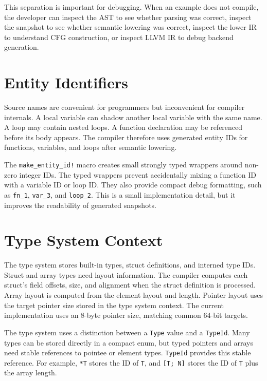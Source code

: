 This separation is important for debugging. When an example does not compile,
the developer can inspect the AST to see whether parsing was correct, inspect
the \irtree{} snapshot to see whether semantic lowering was correct, inspect the
lower IR to understand CFG construction, or inspect LLVM IR to debug backend
generation.

\section{Entity Identifiers}

Source names are convenient for programmers but inconvenient for compiler
internals. A local variable can shadow another local variable with the same
name. A loop may contain nested loops. A function declaration may be referenced
before its body appears. The compiler therefore uses generated entity IDs for
functions, variables, and loops after semantic lowering.

The \texttt{make\_entity\_id!} macro creates small strongly typed wrappers around
non-zero integer IDs. The typed wrappers prevent accidentally mixing a function
ID with a variable ID or loop ID. They also provide compact debug formatting,
such as \texttt{fn\_1}, \texttt{var\_3}, and \texttt{loop\_2}. This is a small
implementation detail, but it improves the readability of generated snapshots.

\section{Type System Context}

The type system stores built-in types, struct definitions, and interned type
IDs. Struct and array types need layout information. The compiler computes each
struct's field offsets, size, and alignment when the struct definition is
processed. Array layout is computed from the element layout and length. Pointer
layout uses the target pointer size stored in the type system context. The
current implementation uses an 8-byte pointer size, matching common 64-bit
targets.

The type system uses a distinction between a \texttt{Type} value and a
\texttt{TypeId}. Many types can be stored directly in a compact enum, but typed
pointers and arrays need stable references to pointee or element types.
\texttt{TypeId} provides this stable reference. For example, \texttt{*T} stores
the ID of \texttt{T}, and \texttt{[T; N]} stores the ID of \texttt{T} plus the
array length.


